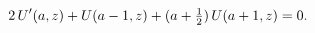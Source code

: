 \[2\mathop{U\/}\nolimits'\!\left(a,z\right)+\mathop{U\/}\nolimits\!\left(a-1,z%
\right)+(a+\tfrac{1}{2})\mathop{U\/}\nolimits\!\left(a+1,z\right)=0.\]